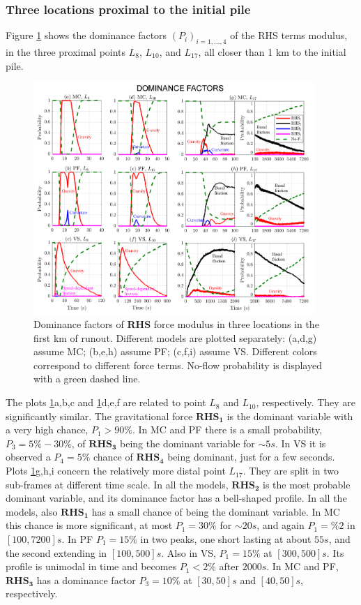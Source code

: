 \documentclass{article}
\begin{document}
\subsubsection{Three locations proximal to the initial pile}
Figure \ref{fig:Colima-Pr1} shows the dominance factors $(P_i)_{i=1,\dots,4}$ of the RHS terms modulus, in the three proximal points $L_{8}$, $L_{10}$, and $L_{17}$, all closer than 1 km to the initial pile.
\begin{figure}[H]
         \centering
        \includegraphics[width=0.95\textwidth]{BAF_VolcanDeColima/ForceContrib/Pr1_total.png}
        \caption{Dominance factors of \textbf{RHS} force modulus in three locations in the first km of runout. Different models are plotted separately: (a,d,g) assume MC; (b,e,h) assume PF; (c,f,i) assume VS. Different colors correspond to different force terms. No-flow probability is displayed with a green dashed line.}
        \label{fig:Colima-Pr1}
\end{figure}
The plots \ref{fig:Colima-Pr1}a,b,c and \ref{fig:Colima-Pr1}d,e,f are related to point $L_8$ and $L_{10}$, respectively. They are significantly similar. The gravitational force $\boldsymbol{RHS_1}$ is the dominant variable with a very high chance, $P_1>90\%$. In MC and PF there is a small probability, $P_3=5\%-30\%$, of $\boldsymbol{RHS_3}$ being the dominant variable for $\sim 5 s$. In VS it is observed a $P_4=5\%$ chance of $\boldsymbol{RHS_4}$ being dominant, just for a few seconds. Plots \ref{fig:Colima-Pr1}g,h,i concern the relatively more distal point $L_{17}$. They are split in two sub-frames at different time scale. In all the models, $\boldsymbol{RHS_2}$ is the most probable dominant variable, and its dominance factor has a bell-shaped profile. In all the models, also $\boldsymbol{RHS_1}$ has a small chance of being the dominant variable. In MC this chance is more significant, at most $P_1=30\%$ for $\sim 20 s$, and again $P_1=\%2$ in $[100, 7200] s$. In PF $P_1=15\%$ in two peaks, one short lasting at about $55 s$, and the second extending in $[100,500] s$. Also in VS, $P_1=15\%$ at $[300, 500] s$. Its profile is unimodal in time and becomes $P_1<2\%$ after $2000 s$. In MC and PF, $\boldsymbol{RHS_3}$ has a dominance factor $P_3=10\%$ at $[30, 50] s$ and $[40, 50] s$, respectively.
\end{document}
